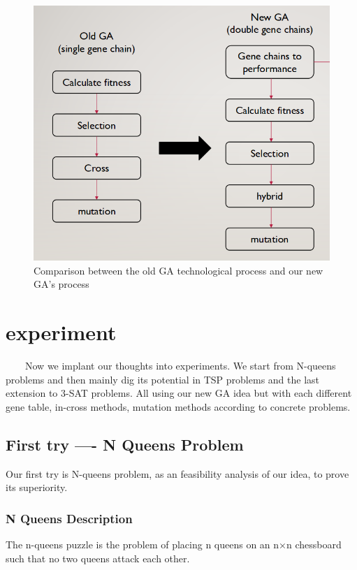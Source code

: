 \documentclass{acmtog} %
\begin{document}
\begin{figure}[ht]
\centering
\includegraphics[scale=0.5]{2}
\caption{Comparison between the old GA technological process and our new GA's process }
\label{fig:label}
\end{figure}


\section{experiment}
\label{sec:experiment}
%
\ \ \ \ Now we implant our thoughts into experiments. We start from N-queens problems and then mainly dig its potential in TSP problems and the last extension to 3-SAT problems. All using our new GA idea but with each different gene table, in-cross methods, mutation methods according to concrete problems.
 
\subsection{First try ---- N Queens Problem}
\label{subsec:nqueens}
Our first try is N-queens problem, as an feasibility analysis of our idea, to prove its superiority. 

\subsubsection{N Queens Description}
\label{subsubsec:nqueensdescription}
\qquad

The n-queens puzzle is the problem of placing n queens on an n×n chessboard such that no two queens attack each other.
\end{document}
